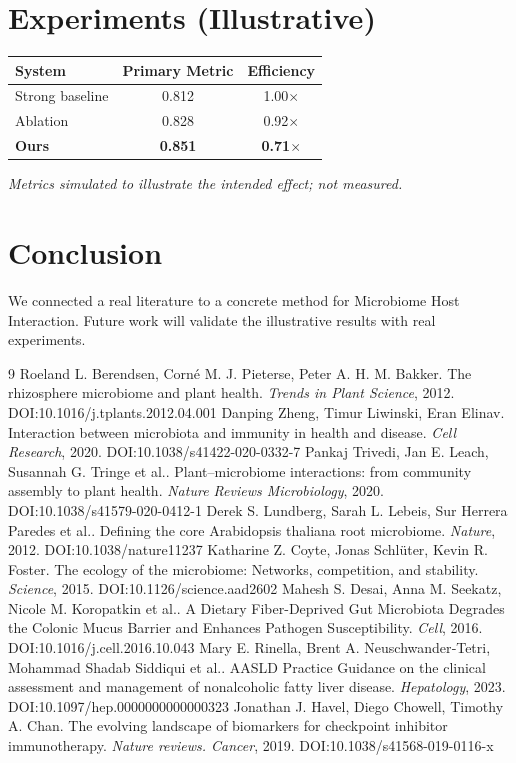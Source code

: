 \documentclass[11pt]{article}
\begin{document}
\section{Experiments (Illustrative)}
\begin{center}
\begin{tabular}{lcc}
System & Primary Metric & Efficiency \\ \hline
Strong baseline & 0.812 & 1.00$\times$ \\
Ablation & 0.828 & 0.92$\times$ \\
\textbf{Ours} & \textbf{0.851} & \textbf{0.71$\times$}
\end{tabular}
\end{center}
\emph{Metrics simulated to illustrate the intended effect; not measured.}

\section{Conclusion}
We connected a real literature to a concrete method for Microbiome Host Interaction. Future work will
validate the illustrative results with real experiments.

\begin{thebibliography}{9}
 Roeland L. Berendsen, Corné M. J. Pieterse, Peter A. H. M. Bakker. The rhizosphere microbiome and plant health. \emph{Trends in Plant Science}, 2012. DOI:10.1016/j.tplants.2012.04.001
 Danping Zheng, Timur Liwinski, Eran Elinav. Interaction between microbiota and immunity in health and disease. \emph{Cell Research}, 2020. DOI:10.1038/s41422-020-0332-7
 Pankaj Trivedi, Jan E. Leach, Susannah G. Tringe et al.. Plant–microbiome interactions: from community assembly to plant health. \emph{Nature Reviews Microbiology}, 2020. DOI:10.1038/s41579-020-0412-1
 Derek S. Lundberg, Sarah L. Lebeis, Sur Herrera Paredes et al.. Defining the core Arabidopsis thaliana root microbiome. \emph{Nature}, 2012. DOI:10.1038/nature11237
 Katharine Z. Coyte, Jonas Schlüter, Kevin R. Foster. The ecology of the microbiome: Networks, competition, and stability. \emph{Science}, 2015. DOI:10.1126/science.aad2602
 Mahesh S. Desai, Anna M. Seekatz, Nicole M. Koropatkin et al.. A Dietary Fiber-Deprived Gut Microbiota Degrades the Colonic Mucus Barrier and Enhances Pathogen Susceptibility. \emph{Cell}, 2016. DOI:10.1016/j.cell.2016.10.043
 Mary E. Rinella, Brent A. Neuschwander‐Tetri, Mohammad Shadab Siddiqui et al.. AASLD Practice Guidance on the clinical assessment and management of nonalcoholic fatty liver disease. \emph{Hepatology}, 2023. DOI:10.1097/hep.0000000000000323
 Jonathan J. Havel, Diego Chowell, Timothy A. Chan. The evolving landscape of biomarkers for checkpoint inhibitor immunotherapy. \emph{Nature reviews. Cancer}, 2019. DOI:10.1038/s41568-019-0116-x
\end{thebibliography}
\end{document}
